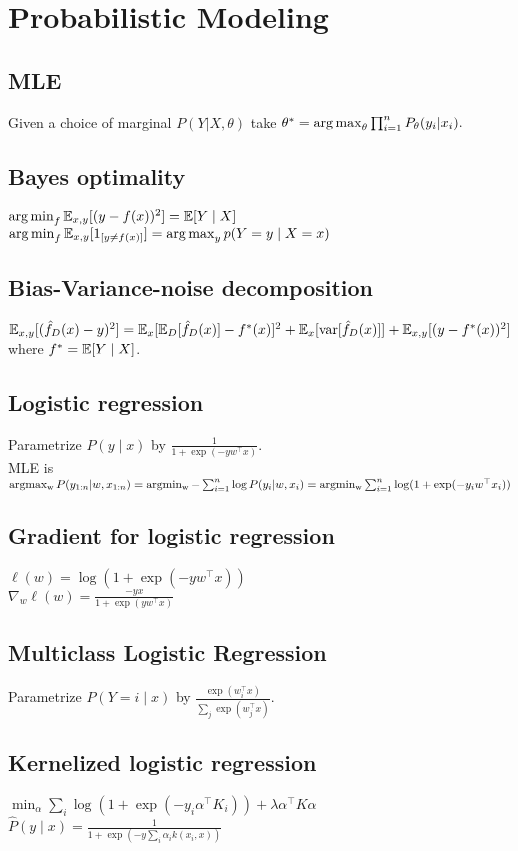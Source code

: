 \section*{Probabilistic Modeling}
\subsection*{MLE}
Given a choice of marginal $P(Y|X,\theta)$ take 
$\theta^* =\operatorname*{arg\,max}_\theta \prod_{i=1}^n {P_\theta}(y_i|x_i).$

\subsection*{Bayes optimality}
$\operatorname*{arg\,min}_f\mathbb{E}_{x,y}[(y-f(x))^2]=\mathbb{E}[Y\mid X]$\\
$\operatorname*{arg\,min}_f\mathbb{E}_{x,y}[1_{[y\neq f(x)]}]\\=\operatorname*{arg\,max}_yp(Y=y\mid X=x)$

\subsection*{Bias-Variance-noise decomposition}
$\mathbb{E}_{x,y}[(\hat{f}_D(x)- y)^2]\\=
\mathbb{E}_x[\mathbb{E}_D[\hat{f}_D(x)]-f^*(x)]^2\\
\hspace*{0.1mm}+\mathbb{E}_x[\operatorname{var}[\hat{f}_D(x)]]\\
\hspace*{0.1mm}+\mathbb{E}_{x,y}[(y-f^*(x))^2]$ where $f^*=\mathbb{E}[Y\mid X]$.


\subsection*{Logistic regression}
Parametrize $P(y\mid x)$ by $\frac{1}{1+\exp(-y w^\top x)}$.\\
MLE is $\operatorname{argmax_w} P(y_{1:n}|w,x_{1:n})\\
= \operatorname{argmin_w} - \sum_{i=1}^n \log P(y_i|w,x_i)\\
= \operatorname{argmin_w} \sum_{i=1}^n \log(1+\exp(-y_i w^\top x_i))$

\subsection*{Gradient for logistic regression}
$\ell(w) = \log(1+\exp(-yw^\top x))$\\
$\nabla_w \ell(w) =\frac{-yx}{1+\exp(yw^\top x)}$

\subsection*{Multiclass Logistic Regression}
Parametrize $P(Y=i\mid x)$ by $\frac{\exp(w_i^\top x)}{\sum_j \exp(w_j^\top x)}$.

\subsection*{Kernelized logistic regression}
$\min_\alpha\sum_i\log(1+\exp(-y_i\alpha^\top K_i)) + \lambda\alpha^\top K \alpha$
$\hat{P}(y\mid x)=\frac{1}{1+\exp(-y\sum_i\alpha_ik(x_i,x))}$
\\